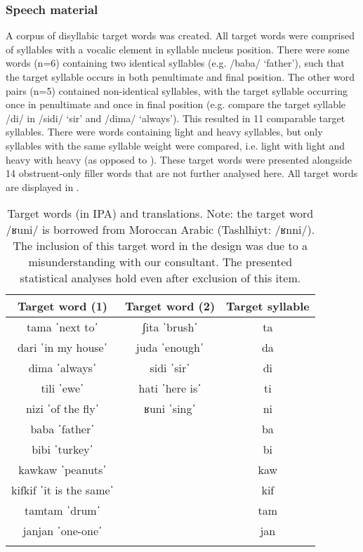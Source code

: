 \subsubsection{Speech material}
A corpus of disyllabic target words was created. All target words were comprised of syllables with a vocalic element in syllable nucleus position. There were some words (n=6) containing two identical syllables (e.g. /baba/ ‘father’), such that the target syllable occurs in both penultimate and final position. The other word pairs (n=5) contained non-identical syllables, with the target syllable occurring once in penultimate and once in final position (e.g. compare the target syllable /di/ in /sidi/ ‘sir’ and /dima/ ‘always’). This resulted in 11 comparable target syllables. There were words containing light and heavy syllables, but only syllables with the same syllable weight were compared, i.e. light with light and heavy with heavy (as opposed to \citealt{GordonNafi2012}). These target words were presented alongside 14 obstruent-only filler words that are not further analysed here. All target words are displayed in .

\begin{table}
  \begin{tabular}{ccc}
    \lsptoprule
    \textbf{Target word (1)}  & \textbf{Target word (2)}  & \textbf{Target syllable} \\
    \midrule
tama ῾next to᾽ & ʃita ῾brush᾽ & ta \\
dari ῾in my house᾽ & juda ῾enough᾽ & da \\
dima ῾always᾽ & sidi ῾sir᾽ & di\\
tili ῾ewe᾽ & hati ῾here is᾽ & ti\\
nizi ῾of the fly᾽ & ʁuni ῾sing᾽ & ni\\
baba ῾father᾽ &	& ba\\
bibi ῾turkey᾽ & & bi\\
kawkaw ῾peanuts᾽ & & kaw\\
kifkif ῾it is the same᾽ & & kif\\
tamtam ῾drum᾽ &	& tam\\
janjan ῾one-one᾽ & & jan\\
\lspbottomrule
  \end{tabular}
  \caption{Target words (in IPA) and translations. Note: the target word /ʁuni/ is borrowed from Moroccan Arabic (Tashlhiyt: /ʁnni/). The inclusion of this target word in the design was due to a misunderstanding with our consultant. The presented statistical analyses hold even after exclusion of this item.}
  \label{tab:4.1}
\end{table} 

